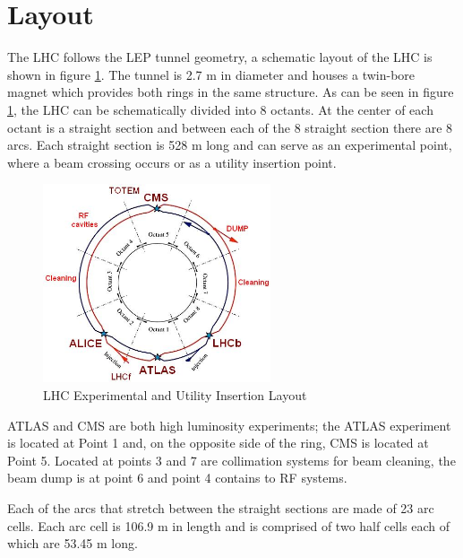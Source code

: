 \section{Layout}
The LHC follows the LEP tunnel geometry,
a schematic layout of the LHC is shown in figure \ref{fig:LHCring}.
The tunnel is 2.7 m in diameter and houses a twin-bore magnet 
which provides both rings in the same structure.
As can be seen in figure \ref{fig:LHCring},
the LHC can be schematically divided 
into 8 octants. At the center of each octant is a straight section and between
each of the 8 straight section there are 8 arcs. Each straight section
is 528 m long and can serve as an experimental point, where a beam
crossing occurs or as a utility insertion point.
\begin{figure}[t]
  \centering
	\includegraphics[width=0.6\textwidth]{images/LHCring.jpg}
  	\caption[LHCring]
   	{LHC Experimental and Utility Insertion Layout}
	\label{fig:LHCring}
\end{figure}
ATLAS and CMS are both high luminosity experiments;
the ATLAS experiment is located at Point 1 and, on the opposite side
of the ring, CMS is located at Point 5. 
Located at points 3 and 7 are collimation systems for beam cleaning,
the beam dump is at point 6 and point 4 contains to RF systems.

Each of the arcs that stretch between the straight sections
are made of 23 arc cells. Each arc cell is 106.9 m in length
and is comprised of two half cells each of which are 53.45 m long.

